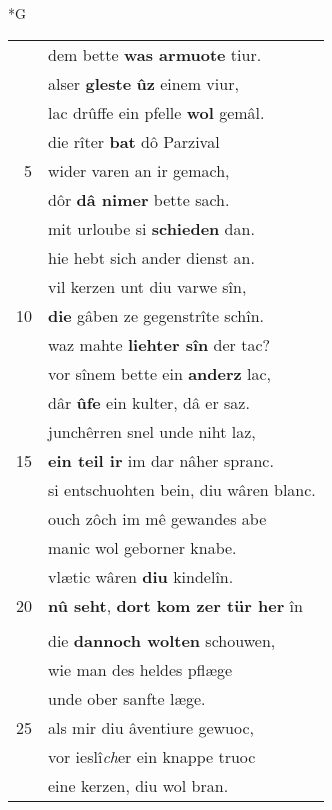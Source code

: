 \documentclass[8pt,a4paper,notitlepage]{article}
\begin{document}
\begin{table}[ht]
\begin{minipage}[t]{0.5\linewidth}
\small
\begin{center}*G
\end{center}
\begin{tabular}{rl}
 & dem bette \textbf{was armuote} tiur.\\ 
 & alser \textbf{gleste} \textbf{ûz} einem viur,\\ 
 & lac drûffe ein pfelle \textbf{wol} gemâl.\\ 
 & die rîter \textbf{bat} dô Parzival\\ 
5 & wider varen an ir gemach,\\ 
 & dôr \textbf{dâ nimer} bette sach.\\ 
 & mit urloube si \textbf{schieden} dan.\\ 
 & hie hebt sich ander dienst an.\\ 
 & vil kerzen unt diu varwe sîn,\\ 
10 & \textbf{die} gâben ze gegenstrîte schîn.\\ 
 & waz mahte \textbf{liehter sîn} der tac?\\ 
 & vor sînem bette ein \textbf{anderz} lac,\\ 
 & dâr \textbf{ûfe} ein kulter, dâ er saz.\\ 
 & junchêrren snel unde niht laz,\\ 
15 & \textbf{ein teil ir} im dar nâher spranc.\\ 
 & si entschuohten bein, diu wâren blanc.\\ 
 & ouch zôch im mê gewandes abe\\ 
 & manic wol geborner knabe.\\ 
 & vlætic wâren \textbf{diu} kindelîn.\\ 
20 & \textbf{nû seht}, \textbf{dort kom zer tür her} în\\ 
 & \textbf{\begin{large}V\end{large}ier} clâre juncvrouwen,\\ 
 & die \textbf{dannoch wolten} schouwen,\\ 
 & wie man des heldes pflæge\\ 
 & unde ober sanfte læge.\\ 
25 & als mir diu âventiure gewuoc,\\ 
 & vor ieslî\textit{ch}er ein knappe truoc\\ 
 & eine kerzen, diu wol bran.\\ 

\end{tabular}
\end{minipage}
\end{table}
\end{document}
